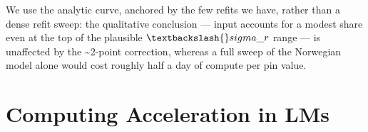 \documentclass[
  11pt,
]{article}
\newenvironment{Shaded}{\begin{snugshade}}{\end{snugshade}}
\newcommand{\NormalTok}[1]{\textcolor[rgb]{0.00,0.23,0.31}{#1}}
\begin{document}
\begin{Shaded}
\begin{Highlighting}[]
\NormalTok{We use the analytic curve, anchored by the few refits we have, rather than a}
\NormalTok{dense refit sweep: the qualitative conclusion — input accounts for a modest share}
\NormalTok{even at the top of the plausible $\textbackslash{}sigma\_r$ range — is unaffected by the}
\NormalTok{\textasciitilde{}2{-}point correction, whereas a full sweep of the Norwegian model alone would cost}
\NormalTok{roughly half a day of compute per pin value.}
\end{Highlighting}
\end{Shaded}

\section{Computing Acceleration in
LMs}\label{computing-acceleration-in-lms}
\end{document}
